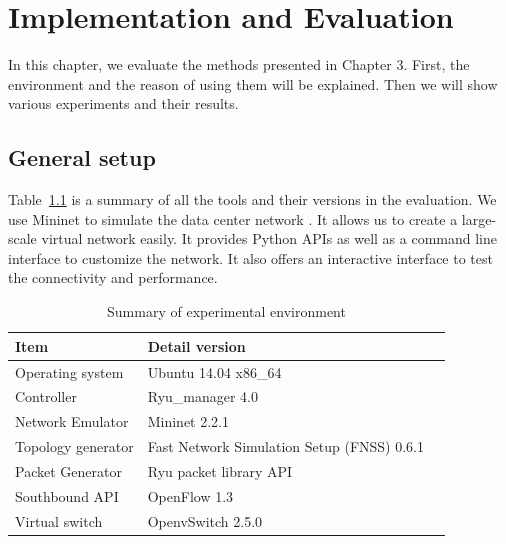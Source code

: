\chapter{Implementation and Evaluation}
\label{Implementation_and_Evaluation}
In this chapter, we evaluate the methods presented in Chapter 3. First, the environment and the reason of using them will be explained. Then we will show various experiments and their results.

\section{General setup}
Table~\ref{table:Experiment_table} is a summary of all the tools and their versions in the evaluation. We use Mininet to simulate the data center network \cite{Mininet}. It allows us to create a large-scale virtual network easily. It provides Python APIs as well as a command line interface to customize the network. It also offers an interactive interface to test the connectivity and performance.

\begin{table}[H]
\centering
\caption{Summary of experimental environment}
\begin{tabular}{|l|p{4cm}|p{4.5cm}}
\hline Item & Detail version \\
\hline
\hline Operating system & Ubuntu 14.04 x86\_64 \\
\hline Controller & Ryu\_manager 4.0 \\
\hline Network Emulator & Mininet 2.2.1 \\
\hline Topology generator & Fast Network Simulation Setup (FNSS) 0.6.1\\
\hline Packet Generator & Ryu packet library API \\
\hline Southbound API & OpenFlow 1.3 \\
\hline Virtual switch & OpenvSwitch 2.5.0 \\
\hline 
\end{tabular}
\label{table:Experiment_table}
\end{table}


